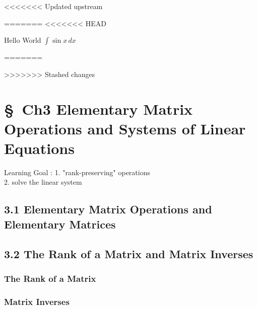 
<<<<<<< Updated upstream


=======
<<<<<<< HEAD

	Hello World 
	$\int \sin x\, dx$

=======


>>>>>>> Stashed changes
\chapter{\S\  Ch3 Elementary Matrix Operations and Systems of Linear Equations}

Learning Goal : 
1. "rank-preserving" operations \\
2. solve the linear system 

\section{3.1 Elementary Matrix Operations and Elementary Matrices }
	





\section{3.2 The Rank of a Matrix and Matrix Inverses } 
\subsection{The Rank of a Matrix}










\subsection{Matrix Inverses}

